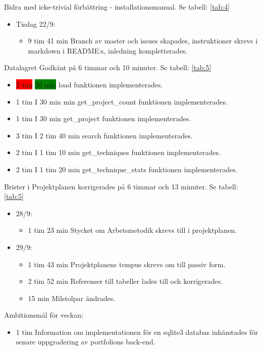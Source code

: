 \documentclass{TDP003mall}
\begin{document}
Bidra med icke-trivial förbättring - installationsmanual. Se tabell: \ref{tab:4}
\begin{itemize}
\item Tisdag 22/9:
  \begin{itemize}
  \item 9 tim 41 min Branch av master och issues skapades, instruktioner skrevs i markdown i README:s, inledning kompletterades.
  \end{itemize}
  \end{itemize}

Datalagret Godkänt på 6 timmar och 10 minuter. Se tabell: \ref{tab:5}
\begin{itemize}
\item \colorbox{red}{2 tim} \colorbox{green}{20 min} load funktionen implementerades.
\item 1 tim I 30 min min get\_project\_count funktionen implementerades.
\item 1 tim I 30 min get\_project funktionen implementerades.
\item 3 tim I 2 tim 40 min search funktionen implementerades.
\item 2 tim I 1 tim 10 min get\_techniques funktionen implementerades.
\item 2 tim I 1 tim 20 min get\_technique\_stats funktionen implementerades.
\end{itemize}

Brister i Projektplanen korrigerades på 6 timmar och 13 minuter. Se tabell: \ref{tab:5}
\begin{itemize}
  \item 28/9:
  \begin{itemize}
  \item 1 tim 23 min Stycket om Arbetsmetodik skrevs till i projektplanen.
  \end{itemize}
  \item 29/9:
  \begin{itemize}
\item 1 tim 43 min Projektplanens tempus skrevs om till passiv form.
\item 2 tim 52 min Referenser till tabeller lades till och korrigerades.
  \item 15 min Milstolpar ändrades.
  \end{itemize}
  \end{itemize}

Ambitionsmål för veckan:
\begin{itemize}
\item 1 tim Information om implementationen för en sqlite3 databas inhämtades för senare uppgradering av portfolions back-end.
  \end{itemize}
\end{document}
